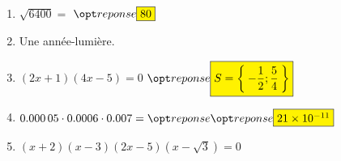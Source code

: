\documentclass[10pt]{report}
\begin{document}
	\begin{minipage}{6cm}
	\begin{enumerate}[leftmargin=*]
		\item $\sqrt{6400} =$ $\rep{80}$
		\item Une année-lumière. 
		\item $(2x+1)(4x-5)=0$\repNewline
			$\rep{S=\Set{-\dfrac{1}{2}; \dfrac{5}{4}}}$
		\item $\num{0,00005} \cdot \num{0,0006} \cdot \num{0,007} = \repNewline \repn{21e-11}$
		\item $(x+2)(x-3)(2x-5)(x-\sqrt{3})=0$\repNewline
	\end{enumerate}
	\end{minipage}
\end{document}
